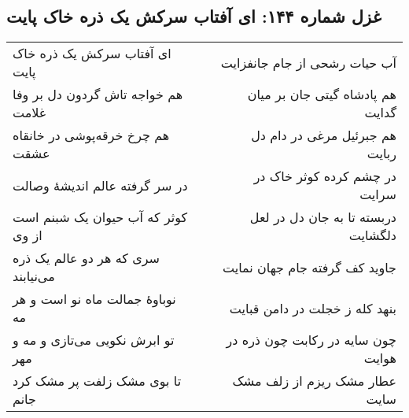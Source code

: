 \begin{center}
\section*{غزل شماره ۱۴۴: ای آفتاب سرکش یک ذره خاک پایت}
\label{sec:144}
\begin{longtable}{l p{0.5cm} r}
ای آفتاب سرکش یک ذره خاک پایت
&&
آب حیات رشحی از جام جانفزایت
\\
هم خواجه تاش گردون دل بر وفا غلامت
&&
هم پادشاه گیتی جان بر میان گدایت
\\
هم چرخ خرقه‌پوشی در خانقاه عشقت
&&
هم جبرئیل مرغی در دام دل ربایت
\\
در سر گرفته عالم اندیشهٔ وصالت
&&
در چشم کرده کوثر خاک در سرایت
\\
کوثر که آب حیوان یک شبنم است از وی
&&
دربسته تا به جان دل در لعل دلگشایت
\\
سری که هر دو عالم یک ذره می‌نیابند
&&
جاوید کف گرفته جام جهان نمایت
\\
نوباوهٔ جمالت ماه نو است و هر مه
&&
بنهد کله ز خجلت در دامن قبایت
\\
تو ابرش نکویی می‌تازی و مه و مهر
&&
چون سایه در رکابت چون ذره در هوایت
\\
تا بوی مشک زلفت پر مشک کرد جانم
&&
عطار مشک ریزم از زلف مشک سایت
\\
\end{longtable}
\end{center}
